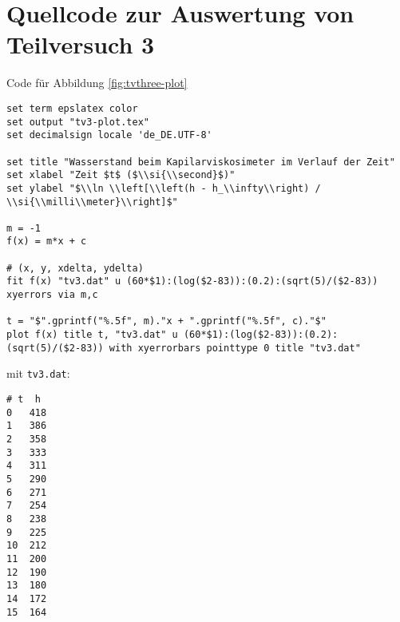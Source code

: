 \section{\gnuplot{} Quellcode zur Auswertung von Teilversuch 3}
	\label{appdx:gnuplotTV3}

	\gnuplot{} Code für Abbildung \ref{fig:tvthree-plot}
	{  
        \renewcommand{\fcolorbox}[4][]{#4}
        \begin{verbatim}
set term epslatex color
set output "tv3-plot.tex"
set decimalsign locale 'de_DE.UTF-8'

set title "Wasserstand beim Kapilarviskosimeter im Verlauf der Zeit"
set xlabel "Zeit $t$ ($\\si{\\second}$)"
set ylabel "$\\ln \\left[\\left(h - h_\\infty\\right) / \\si{\\milli\\meter}\\right]$"

m = -1
f(x) = m*x + c

# (x, y, xdelta, ydelta)
fit f(x) "tv3.dat" u (60*$1):(log($2-83)):(0.2):(sqrt(5)/($2-83)) xyerrors via m,c

t = "$".gprintf("%.5f", m)."x + ".gprintf("%.5f", c)."$"
plot f(x) title t, "tv3.dat" u (60*$1):(log($2-83)):(0.2):(sqrt(5)/($2-83)) with xyerrorbars pointtype 0 title "tv3.dat"
        \end{verbatim}
    }
    mit \texttt{tv3.dat}:
    \begin{verbatim}
# t  h
0   418
1   386
2   358
3   333
4   311
5   290
6   271
7   254
8   238
9   225
10  212
11  200
12  190
13  180
14  172
15  164
    \end{verbatim}

\newpage
